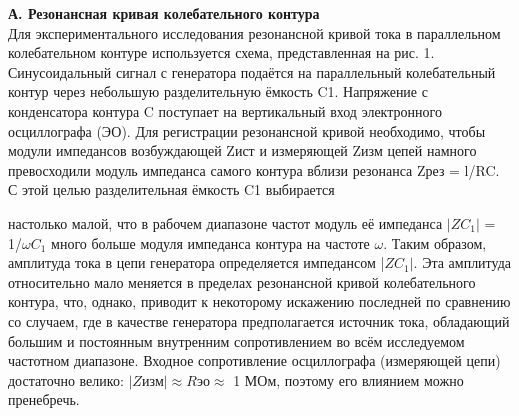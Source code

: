 \documentclass[a4paper, 12pt]{article}%
\begin{document}
	\textbf{А. Резонансная кривая колебательного контура}\\
	Для экспериментального исследования резонансной кривой тока в
	параллельном колебательном контуре используется схема, представленная на рис. 1. Синусоидальный сигнал с генератора подаётся на параллельный колебательный контур через небольшую разделительную ёмкость C1. Напряжение с конденсатора контура C поступает на вертикальный вход электронного осциллографа (ЭО). Для регистрации резонансной кривой необходимо, чтобы модули импедансов возбуждающей Zист и измеряющей Zизм цепей намного превосходили модуль импеданса самого контура вблизи резонанса Zрез = l/RC. С этой целью разделительная ёмкость C1 выбирается
	
	\begin{figure}[h]
	\end{figure}
	
	\newpage
	
	настолько малой, что в рабочем диапазоне частот модуль её импеданса
	$|ZC_1|$ = 1/$\omega C_1$ много больше модуля импеданса контура на частоте $\omega$.
	Таким образом, амплитуда тока в цепи генератора определяется импедансом |$ZC_1|$. Эта амплитуда относительно мало меняется в пределах резонансной кривой колебательного контура, что, однако, приводит к некоторому искажению последней по сравнению со случаем,  где в качестве генератора предполагается источник тока, обладающий большим и постоянным внутренним сопротивлением во всём исследуемом частотном диапазоне. Входное сопротивление осциллографа (измеряющей цепи) достаточно велико: $|Zизм| \approx Rэо \approx$ 1 МОм, поэтому его влиянием можно пренебречь.
	
\end{document}
